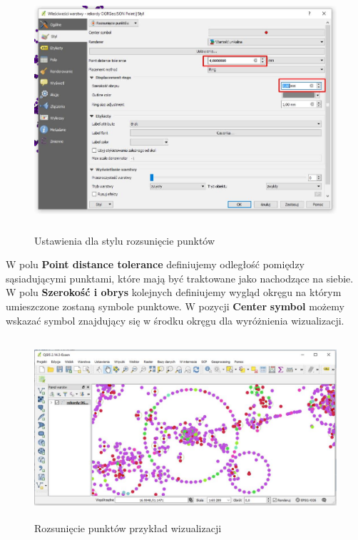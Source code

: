 \documentclass[12pt,a4paper]{book}
\begin{document}
\begin{center}
\begin{figure}
\includegraphics[width=13cm,height=8.946cm]{007-rozsuniecie.jpg}
\caption{Ustawienia dla stylu rozsunięcie punktów}
\end{figure}
\end{center}
W polu \textbf{Point distance tolerance} definiujemy odległość pomiędzy sąsiadującymi punktami, które mają być traktowane jako nachodzące na siebie. W polu \textbf{Szerokość i obrys} kolejnych definiujemy wygląd okręgu na którym umieszczone zostaną symbole punktowe. W pozycji \textbf{Center} \textbf{symbol} możemy wskazać symbol znajdujący się w środku okręgu dla wyróżnienia wizualizacji.



\begin{center}
\begin{figure}
\includegraphics[width=13cm,height=6.689cm]{007-rozs-wiz.jpg}
\caption{Rozsunięcie punktów przykład wizualizacji}
\end{figure}
\end{center}
\end{document}
